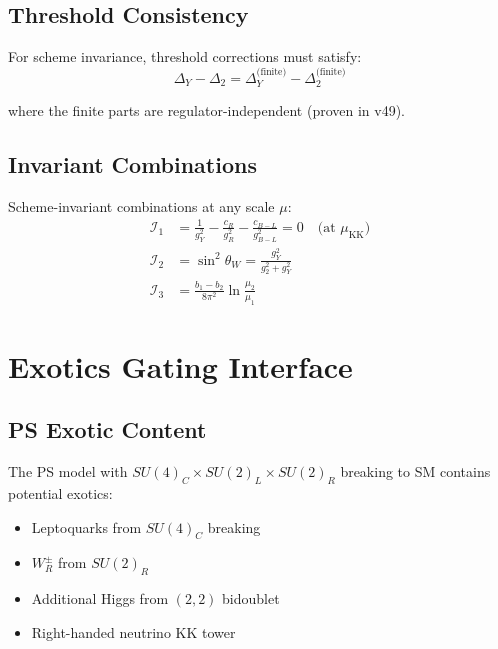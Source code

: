 \documentclass[11pt,a4paper]{article}
\begin{document}
\subsection{Threshold Consistency}
\label{subsec:threshold-consistency}

For scheme invariance, threshold corrections must satisfy:
\begin{equation}
\label{eq:threshold-constraint}
\Delta_Y - \Delta_2 = \Delta_Y^{\text{(finite)}} - \Delta_2^{\text{(finite)}}
\end{equation}

where the finite parts are regulator-independent (proven in v49).

\subsection{Invariant Combinations}
\label{subsec:invariants}

Scheme-invariant combinations at any scale $\mu$:
\begin{align}
\label{eq:inv-1}
\mathcal{I}_1 &= \frac{1}{g_Y^2} - \frac{c_R}{g_R^2} - \frac{c_{B-L}}{g_{B-L}^2} = 0 \quad \text{(at } \mu_{\text{KK}} \text{)} \\
\label{eq:inv-2}
\mathcal{I}_2 &= \sin^2\theta_W = \frac{g_Y^2}{g_2^2 + g_Y^2} \\
\label{eq:inv-3}
\mathcal{I}_3 &= \frac{b_1 - b_2}{8\pi^2}\ln\frac{\mu_2}{\mu_1}
\end{align}

\section{Exotics Gating Interface}
\label{sec:exotics}

\subsection{PS Exotic Content}
\label{subsec:exotic-content}

The PS model with $SU(4)_C \times SU(2)_L \times SU(2)_R$ breaking to SM contains potential exotics:
\begin{itemize}
\item Leptoquarks from $SU(4)_C$ breaking
\item $W_R^\pm$ from $SU(2)_R$
\item Additional Higgs from $(2,2)$ bidoublet
\item Right-handed neutrino KK tower
\end{itemize}
\end{document}
